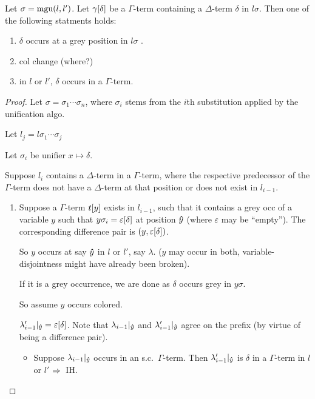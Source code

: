 \documentclass[,%
	paper=a4,%
	DIV11, %
	twoside=false,%
	liststotoc,
	bibtotoc,
	draft=false,%
	numbers=noendperiod
]{scrartcl}
\begin{document}
\clearpage
\begin{clemma}
	Let $\sigma = \operatorname{mgu}(l, l')$.
	Let $\gamma[\delta]$ be a $\Gamma$-term containing a $\Delta$-term $\delta$ in $l\sigma$.
	Then one of the following statments holds:
	\begin{enumerate}
		\item $\delta$ occurs at a grey position in $l\sigma$ .
		\item col change (where?)
		\item in $l$ or $l'$, $\delta$ occurs in a $\Gamma$-term.
	\end{enumerate}
\end{clemma}
\begin{proof}
	Let $\sigma = \sigma_1 \cdots \sigma_n$, where $\sigma_i$ stems from the $i$th substitution applied by the unification algo.

	Let $l_j = l\sigma_1 \cdots \sigma_j$

	Let $\sigma_i$ be unifier $x \mapsto \delta$.

	Suppose $l_i $ contains a $\Delta$-term in a $\Gamma$-term, where the respective predecessor of the $\Gamma$-term does not have a $\Delta$-term at that position or does not exist in $l_{i-1}$.

	\begin{enumerate}
			\item
				Suppose a $\Gamma$-term $t[y]$ exists in $l_{i-1}$, such that it contains a grey occ of a variable $y$ such that $y\sigma_i = \varepsilon[\delta]$ at position $\bm\hat y$ (where $\varepsilon$ may be ``empty'').
				The corresponding difference pair is $(y, \varepsilon[\delta])$.

				So $y$ occurs at say $\bm\hat y$ in $l$ or $l'$, say $\lambda$. ($y$ may occur in both, variable-disjointness might have already been broken).

				If it is a grey occurrence, we are done as $\delta$ occurs grey in $y\sigma$. 

				So assume $y$ occurs colored.
				
				$\lambda'_{i-1}|_{\bm\hat y} = \varepsilon[\delta]$.
				Note that $\lambda_{i-1}|_{\bm\hat y}$ and $\lambda'_{i-1}|_{\bm\hat y}$ agree on the prefix (by virtue of being a difference pair).

				\begin{itemize}
						\item
							Suppose $\lambda_{i-1}|_{\bm\hat y}$ occurs in an s.c.\ $\Gamma$-term.
							Then $\lambda'_{i-1}|_{\bm\hat y}$ is $\delta$ in a $\Gamma$-term in $l$ or $l'$ $\Rightarrow$~IH.


\end{itemize}
\end{enumerate}
\end{proof}
\end{document}
